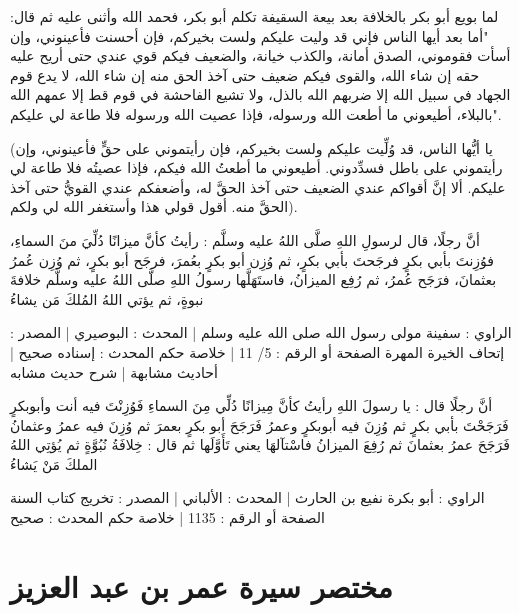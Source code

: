 لما بويع أبو بكر بالخلافة بعد بيعة السقيفة تكلم أبو بكر، فحمد الله وأثنى عليه ثم قال:
"أما بعد أيها الناس فإني قد وليت عليكم ولست بخيركم، فإن أحسنت فأعينوني، وإن أسأت فقوموني، الصدق أمانة، والكذب خيانة، والضعيف فيكم قوي عندي حتى أريح عليه حقه إن شاء الله، والقوى فيكم ضعيف حتى آخذ الحق منه إن شاء الله، لا يدع قوم الجهاد في سبيل الله إلا ضربهم الله بالذل، ولا تشيع الفاحشة في قوم قط إلا عمهم الله بالبلاء، أطيعوني ما أطعت الله ورسوله، فإذا عصيت الله ورسوله فلا طاعة لي عليكم".

(يا أيُّها الناس، قد وُلِّيت عليكم ولست بخيركم، فإن رأيتموني على حقٍّ فأعينوني، وإن رأيتموني على باطل فسدِّدوني. أطيعوني ما أطعتُ الله فيكم، فإذا عصيتُه فلا طاعة لي عليكم. ألا إنَّ أقواكم عندي الضعيف حتى آخذ الحقَّ له، وأضعفكم عندي القويُّ حتى آخذ الحقَّ منه. أقول قولي هذا وأستغفر الله لي ولكم).

أنَّ رجلًا، قال لرسولِ اللهِ صلَّى اللهُ عليه وسلَّم : رأيتُ كأنَّ ميزانًا دُلِّيَ منَ السماءِ، فوُزِنتَ بأبي بكرٍ فرجَحتَ بأبي بكرٍ، ثم وُزِن أبو بكرٍ بعُمرَ، فرجَح أبو بكرٍ، ثم وُزِن عُمرُ بعثمانَ، فرَجَح عُمرُ، ثم رُفِع الميزانُ، فاستَهَلَّها رسولُ اللهِ صلَّى اللهُ عليه وسلَّم خلافةَ نبوةٍ، ثم يؤتي اللهُ المُلكَ مَن يشاءُ

الراوي : سفينة مولى رسول الله صلى الله عليه وسلم | المحدث : البوصيري | المصدر : إتحاف الخيرة المهرة
الصفحة أو الرقم : 5/ 11 | خلاصة حكم المحدث : إسناده صحيح | أحاديث مشابهة | شرح حديث مشابه

أنَّ رجلًا قال : يا رسولَ اللهِ رأيتُ كأنَّ مِيزانًا دُلِّي مِنَ السماءِ فَوُزِنْتَ فيه أنت وأبوبكرٍ فَرَجَحْتَ بأبي بكرٍ ثم وُزِنَ فيه أبوبكرٍ وعمرُ فَرَجَحَ أبو بكرٍ بعمرَ ثم وُزِنَ فيه عمرُ وعثمانُ فَرَجَحَ عمرُ بعثمانَ ثم رُفِعَ الميزانُ فاسْتآلهَا يعني تَأَوَّلَها ثم قال : خِلافَةُ نُبُوَّةٍ ثم يُؤتِي اللهُ الملكَ مَنْ يَشاءُ

الراوي : أبو بكرة نفيع بن الحارث | المحدث : الألباني | المصدر : تخريج كتاب السنة
الصفحة أو الرقم : 1135 | خلاصة حكم المحدث : صحيح 

\section{مختصر سيرة عمر بن عبد العزيز}

